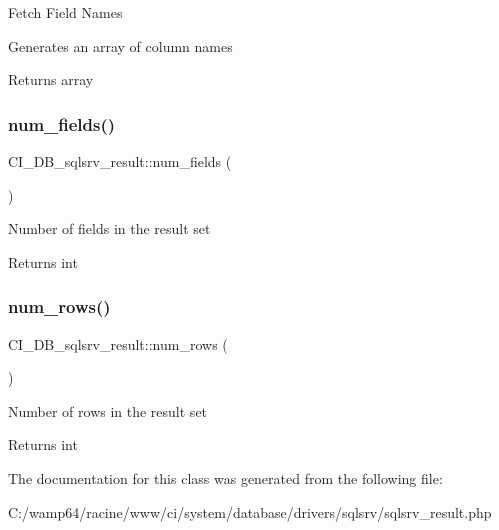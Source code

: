 Fetch Field Names

Generates an array of column names

\begin{DoxyReturn}{Returns}
array 
\end{DoxyReturn}
\mbox{\label{class_c_i___d_b__sqlsrv__result_af6ddd0d270b2913598b850cbef49e5d7}} 
\subsubsection{\texorpdfstring{num\+\_\+fields()}{num\_fields()}}
{\footnotesize\ttfamily C\+I\+\_\+\+D\+B\+\_\+sqlsrv\+\_\+result\+::num\+\_\+fields (\begin{DoxyParamCaption}{ }\end{DoxyParamCaption})}

Number of fields in the result set

\begin{DoxyReturn}{Returns}
int 
\end{DoxyReturn}
\mbox{\label{class_c_i___d_b__sqlsrv__result_a36f1e9f6038aee91dbfd7ad455459083}} 
\subsubsection{\texorpdfstring{num\+\_\+rows()}{num\_rows()}}
{\footnotesize\ttfamily C\+I\+\_\+\+D\+B\+\_\+sqlsrv\+\_\+result\+::num\+\_\+rows (\begin{DoxyParamCaption}{ }\end{DoxyParamCaption})}

Number of rows in the result set

\begin{DoxyReturn}{Returns}
int 
\end{DoxyReturn}


The documentation for this class was generated from the following file\+:\begin{DoxyCompactItemize}
\item 
C\+:/wamp64/racine/www/ci/system/database/drivers/sqlsrv/sqlsrv\+\_\+result.\+php\end{DoxyCompactItemize}
